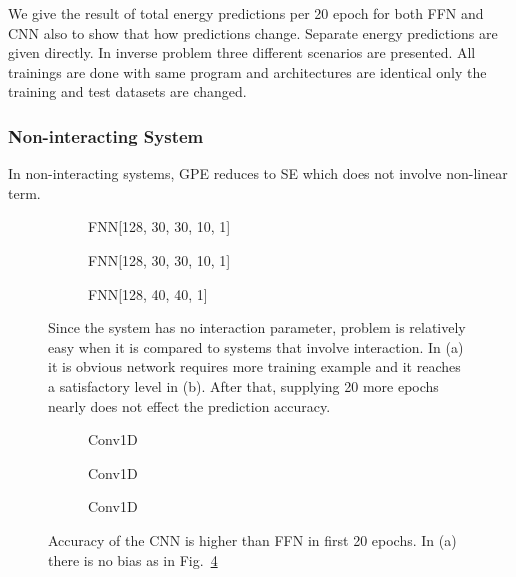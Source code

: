 \documentclass[a4paper,times,12pt]{article}
\begin{document}
We give the result of total energy predictions per 20 epoch for both FFN and CNN also to show that how predictions change. Separate energy predictions are given directly. In inverse problem three different scenarios are presented. All trainings are done with same program and architectures are identical only the training and test datasets are changed. 

\subsubsection{Non-interacting System}

In non-interacting systems, GPE reduces to SE which does not involve non-linear term. 

\begin{figure}[H]
    \centering
    \begin{subfigure}[t]{0.45\textwidth}
		\centering
        
        \caption{FNN[128, 30, 30, 10, 1]}
		\label{fig:a}
    \end{subfigure}\hfill
    \begin{subfigure}[t]{0.45\textwidth}
		\centering
        
        \caption{FNN[128, 30, 30, 10, 1]}
		\label{fig:b}
    \end{subfigure}\hfill    
    \begin{subfigure}[t]{0.45\textwidth}
        \centering
        
        \caption{FNN[128, 40, 40, 1]}
		\label{fig:c}
    \end{subfigure}
    \caption{Since the system has no interaction parameter, problem is relatively easy when it is compared to systems that involve interaction. In (a) it is obvious network requires more training example and it reaches a satisfactory level in (b). After that, supplying 20 more epochs nearly does not effect the prediction accuracy.}
\label{fig:FFN-g-0}
\end{figure}


\begin{figure}[H]
    \centering
    \begin{subfigure}[t]{0.45\textwidth}
		\centering
        
        \caption{Conv1D}
		\label{fig:a}
    \end{subfigure}\hfill
    \begin{subfigure}[t]{0.45\textwidth}
		\centering
        
        \caption{Conv1D}
		\label{fig:b}
    \end{subfigure}\hfill    
    \begin{subfigure}[t]{0.45\textwidth}
        \centering
        
        \caption{Conv1D}
		\label{fig:c}
    \end{subfigure}
    \caption{Accuracy of the CNN is higher than FFN in first 20 epochs. In (a) there is no bias as in Fig.~\ref{fig:FFN-g-0}}
\end{figure}
\end{document}
